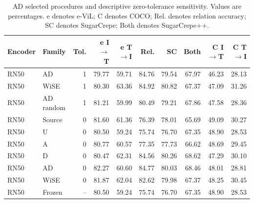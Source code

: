 \begin{table}[t]
\centering
\scriptsize
\setlength{\tabcolsep}{3pt}
\begin{tabular}{llrrrrrrrr}
\toprule
Encoder & Family & Tol. & e I$\to$T & e T$\to$I & Rel. & SC & Both & C I$\to$T & C T$\to$I\\
\midrule
RN50 & AD & 1 & 79.77 & 59.71 & 84.76 & 79.54 & 67.97 & 46.23 & 28.13\\
RN50 & WiSE & 1 & 80.30 & 63.36 & 84.92 & 80.82 & 67.37 & 47.09 & 31.26\\
RN50 & AD random & 1 & 81.21 & 59.99 & 80.49 & 79.21 & 67.86 & 47.58 & 28.36\\
RN50 & Source & 0 & 81.60 & 61.36 & 76.39 & 78.01 & 65.69 & 49.09 & 30.27\\
RN50 & U & 0 & 80.50 & 59.24 & 75.74 & 76.70 & 67.35 & 48.90 & 28.53\\
RN50 & A & 0 & 80.77 & 60.57 & 77.35 & 77.73 & 66.62 & 48.69 & 29.45\\
RN50 & D & 0 & 80.47 & 62.31 & 84.56 & 80.26 & 68.62 & 47.29 & 30.10\\
RN50 & AD & 0 & 82.27 & 60.60 & 84.77 & 80.03 & 68.46 & 48.01 & 28.81\\
RN50 & WiSE & 0 & 81.87 & 62.04 & 82.62 & 79.98 & 67.37 & 48.25 & 30.45\\
RN50 & Frozen & -- & 80.50 & 59.24 & 75.74 & 76.70 & 67.35 & 48.90 & 28.53\\
\bottomrule
\end{tabular}
\caption{AD selected procedures and descriptive zero-tolerance sensitivity. Values are percentages. e denotes e-ViL; C denotes COCO; Rel. denotes relation accuracy; SC denotes SugarCrepe; Both denotes SugarCrepe++.}\label{tab:admetrics18}
\end{table}


